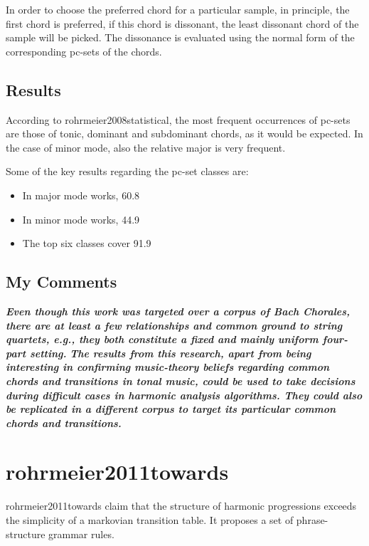     In order to choose the preferred chord for a particular sample, in principle, the first chord is preferred, if this chord is dissonant, the least dissonant chord of the sample will be picked. The dissonance is evaluated using the normal form of the corresponding pc-sets of the chords.

  \subsection{Results}
    According to rohrmeier2008statistical, the most frequent occurrences of pc-sets are those of tonic, dominant and subdominant chords, as it would be expected. In the case of minor mode, also the relative major is very frequent.

    Some of the key results regarding the pc-set classes are:
    \begin{itemize}
      \item In major mode works, 60.8%
      \item In minor mode works, 44.9%
      \item The top six classes cover 91.9%
    \end{itemize}


  \subsection{My Comments}
    \emph{\textbf{
      Even though this work was targeted over a corpus of Bach Chorales, there are at least a few relationships and common ground to string quartets, e.g., they both constitute a fixed and mainly uniform four-part setting.
    }}
    \emph{\textbf{
      The results from this research, apart from being interesting in confirming music-theory beliefs regarding common chords and transitions in tonal music, could be used to take decisions during difficult cases in harmonic analysis algorithms. They could also be replicated in a different corpus to target its particular common chords and transitions.
    }}

\section{rohrmeier2011towards }
  rohrmeier2011towards claim that the structure of harmonic progressions exceeds the simplicity of a markovian transition table. It proposes a set of phrase-structure grammar rules.

